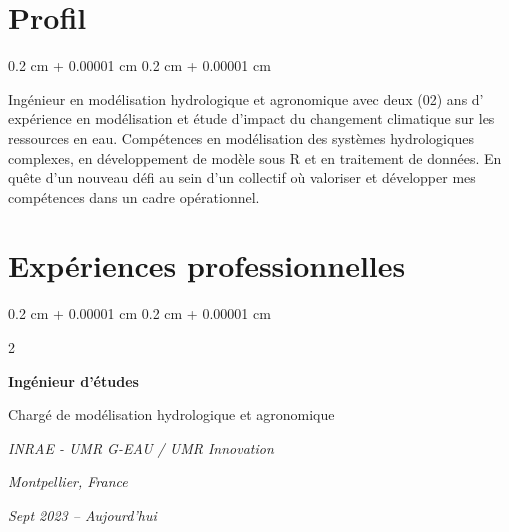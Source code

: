 \documentclass[10pt, letterpaper]{article}
\newenvironment{onecolentry}{
  \begin{adjustwidth}{
    0.2 cm + 0.00001 cm
  }{
    0.2 cm + 0.00001 cm
  }
}{
  \end{adjustwidth}
} %
\newenvironment{twocolentry}[2][]{
  \onecolentry
  \def\secondColumn{#2}
  \setcolumnwidth{\fill, 4.6 cm}
  \begin{paracol}{2}
}{
  \switchcolumn \raggedleft \secondColumn
  \end{paracol}
  \endonecolentry
} %
\begin{document}
\section{Profil}

\begin{onecolentry}
  Ingénieur en modélisation hydrologique et agronomique avec deux (02) ans d'
  expérience en modélisation et étude d'impact du changement climatique sur les
  ressources en eau.
  Compétences en modélisation des systèmes hydrologiques complexes, en
  développement de modèle sous R et en traitement de données.
  En quête d'un nouveau défi au sein d'un collectif où valoriser et développer
  mes compétences dans un cadre opérationnel.
\end{onecolentry}


\section{Expériences professionnelles}

  \begin{twocolentry}
    {
      \textit{Montpellier, France}
      
      \textit{Sept 2023 – Aujourd'hui}
    } {
      \textbf{Ingénieur d'études}

      Chargé de modélisation hydrologique et agronomique

      \textit{INRAE - UMR G-EAU / UMR Innovation}
    }
  \end{twocolentry}

  \vspace{0.10 cm}
\end{document}

